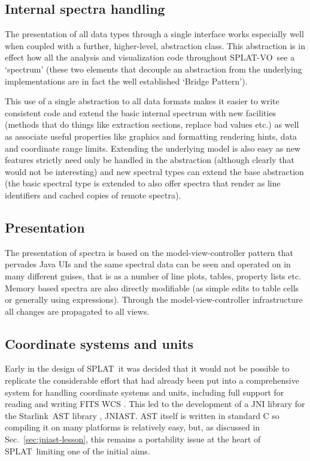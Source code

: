 \documentclass[final,authoryear,5p,times,twocolumn]{elsarticle}
\newcommand{\splat}{\textsf{\small SPLAT}}
\newcommand{\splatvo}{{\textsf{\small{SPLAT-VO}}}}
\newcommand{\Starlink}{\textsf{\small Starlink}}
\newcommand{\ascl}[1]{\href{http://www.ascl.net/#1}{ascl:#1}}
\begin{document}
\subsection{Internal spectra handling}
%
The presentation of all data types through a single interface works especially
well when coupled with a further, higher-level, abstraction class. This
abstraction is in effect how all the analysis and visualization code throughout
\splatvo\ see a `spectrum' (these two elements that decouple an abstraction
from the underlying implementations are in fact the well established `Bridge
Pattern').

This use of a single abstraction to all data formats makes it easier to write
consistent code and extend the basic internal spectrum with new facilities
(methods that do things like extraction sections, replace bad values etc.) as
well as associate useful properties like graphics and formatting rendering
hints, data and coordinate range limits. Extending the underlying model is also
easy as new features strictly need only be handled in the abstraction (although
clearly that would not be interesting) and new spectral types can extend the
base abstraction (the basic spectral type is extended to also offer spectra
that render as line identifiers and cached copies of remote spectra).


\subsection{Presentation}
%
The presentation of spectra is based on the model-view-controller pattern that
pervades Java UIs and the same spectral data can be seen and operated on in
many different guises, that is as a number of line plots, tables, property
lists etc. Memory based spectra are also directly modifiable (as simple edits
to table cells or generally using expressions). Through the
model-view-controller infrastructure all changes are propagated to all views.

\subsection{Coordinate systems and units}
%
Early in the design of \splat\ it was decided that it would not be possible to
replicate the considerable effort that had already been put into a
comprehensive system for handling coordinate systems and units, including full
support for reading and writing FITS WCS \citep{2006A&A...446..747G}. This led
to the development of a JNI library for the \Starlink\ AST library
\citep[][\ascl{1404.016}]{1998ASPC..145...41W,2012ASPC..461..825B}, JNIAST. AST
itself is written in standard C so compiling it on many platforms is relatively
easy, but, as discussed in Sec.\ \ref{sec:jniast-lesson}, this remains a
portability issue at the heart of \splat\ limiting one of the initial aims.
\end{document}
